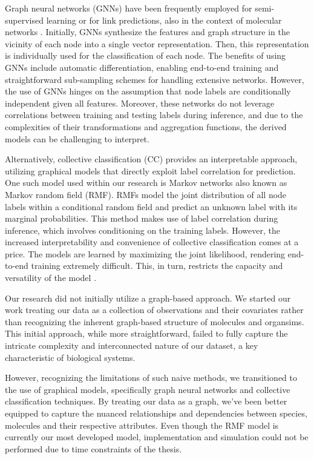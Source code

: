 \documentclass[
11pt, %
oneside, %
english, %
singlespacing, %
headsepline, %
chapterinoneline, %
]{MastersDoctoralThesis} %
\begin{document}
Graph neural networks (GNNs) \cite{wuGraphNeuralNetworks2022} have been frequently employed for semi-supervised learning or for link predictions, also in the context of molecular networks \cite{oyetundeBoostGAPFILLImprovingFidelity2017}. Initially, GNNs synthesize the features and graph structure in the vicinity of each node into a single vector representation. Then, this representation is individually used for the classification of each node. The benefits of using GNNs include automatic differentiation, enabling end-to-end training and straightforward sub-sampling schemes for handling extensive networks. However, the use of GNNs hinges on the assumption that node labels are conditionally independent given all features. Moreover, these networks do not leverage correlations between training and testing labels during inference, and due to the complexities of their transformations and aggregation functions, the derived models can be challenging to interpret.

Alternatively, collective classification (CC) \cite{senCollectiveClassificationNetwork2008} provides an interpretable approach, utilizing graphical models that directly exploit label correlation for prediction. One such model used within our research is Markov networks also known as Markov random field (RMF). RMFs model the joint distribution of all node labels within a conditional random field and predict an unknown label with its marginal probabilities. This method makes use of label correlation during inference, which involves conditioning on the training labels. However, the increased interpretability and convenience of collective classification comes at a price. The models are learned by maximizing the joint likelihood, rendering end-to-end training extremely difficult. This, in turn, restricts the capacity and versatility of the model \cite{jiaGraphBeliefPropagation2021}.

Our research did not initially utilize a graph-based approach. We started our work treating our data as a collection of observations and their covariates rather than recognizing the inherent graph-based structure of molecules and organsims. This initial approach, while more straightforward, failed to fully capture the intricate complexity and interconnected nature of our dataset, a key characteristic of biological systems.

However, recognizing the limitations of such naive methods, we transitioned to the use of graphical models, specifically graph neural networks and collective classification techniques. By treating our data as a graph, we've been better equipped to capture the nuanced relationships and dependencies between species, molecules and their respective attributes. Even though the RMF model is currently our most developed model, implementation and simulation could not be performed due to time constraints of the thesis.  
\end{document}

